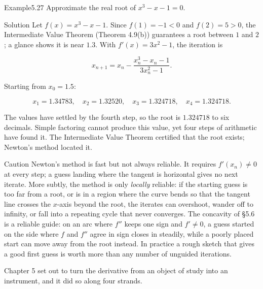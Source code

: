 \documentclass[a4paper,12pt,oneside]{memoir}
\begin{document}
\begin{workedexample}
\begin{envexample}{Example}{5.27}{}
Approximate the real root of \(x^{3} - x - 1 = 0\).
\end{envexample}
\begin{envsolution}{Solution}{}{}
Let \(f(x) = x^{3} - x - 1\). Since \(f(1) = -1 < 0\) and \(f(2) = 5 > 0\), the Intermediate Value Theorem (Theorem 4.9(b)) guarantees a root between \(1\) and \(2\); a glance shows it is near \(1.3\). With \(f'(x) = 3x^{2} - 1\), the iteration is

\[ x_{n+1} = x_{n} - \frac{x_{n}^{3} - x_{n} - 1}{3x_{n}^{2} - 1}. \]

Starting from \(x_{0} = 1.5\):

\[ x_{1} = 1.34783, \quad x_{2} = 1.32520, \quad x_{3} = 1.324718, \quad x_{4} = 1.324718. \]

The values have settled by the fourth step, so the root is \(1.324718\) to six decimals. Simple factoring cannot produce this value, yet four steps of arithmetic have found it. The Intermediate Value Theorem certified that the root exists; Newton’s method located it. \qedmark
\end{envsolution}
\end{workedexample}
\begin{envcaution}{Caution}{}{}
Newton’s method is fast but not always reliable. It requires \(f'(x_{n}) \ne 0\) at every step; a guess landing where the tangent is horizontal gives no next iterate. More subtly, the method is only \emph{locally} reliable: if the starting guess is too far from a root, or is in a region where the curve bends so that the tangent line crosses the \(x\)-axis beyond the root, the iterates can overshoot, wander off to infinity, or fall into a repeating cycle that never converges. The concavity of §5.6 is a reliable guide: on an arc where \(f''\) keeps one sign and \(f' \ne 0\), a guess started on the side where \(f\) and \(f''\) agree in sign closes in steadily, while a poorly placed start can move away from the root instead. In practice a rough sketch that gives a good first guess is worth more than any number of unguided iterations.
\end{envcaution}
Chapter 5 set out to turn the derivative from an object of study into an instrument, and it did so along four strands.
\end{document}
